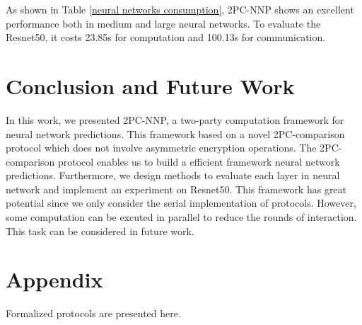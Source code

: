 \documentclass[letterpaper]{article} %
\begin{document}
    \begin{table}[!ht]
    
        \center
        \caption{Experiment III-Neural networks consumption}
        \label{neural networks consumption}
    \end{table}
    
    As shown in Table \ref{neural networks consumption}, 2PC-NNP shows an excellent performance
    both in medium and large neural networks. To evaluate the Resnet50, 
    it costs 23.85s for computation and 100.13s for communication.

    \section{Conclusion and Future Work}
    In this work, we presented 2PC-NNP, a two-party computation framework for neural network predictions.
    This framework based on a novel 2PC-comparison protocol which does not involve asymmetric encryption operations.
    The 2PC-comparison protocol enables us to build a efficient framework neural network predictions.
    Furthermore, we design methods to evaluate each layer in neural network and implement an experiment on Resnet50.
    This framework has great potential since we only consider the serial implementation of protocols.
    However, some computation can be excuted in parallel to reduce the rounds of interaction.
    This task can be considered in future work.
    \section{Appendix}
    Formalized protocols are presented here.
    
\end{document}
